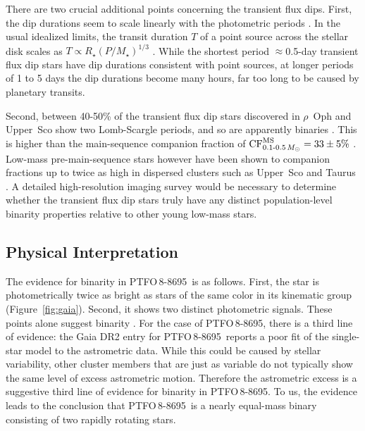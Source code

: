 \documentclass[12pt,twocolumn,tighten]{aastex62}
\newcommand{\ptfo}{PTFO$\,$8-8695}
\begin{document}
There are two crucial additional points concerning the transient flux
dips.  First, the dip durations seem to scale linearly with
the photometric periods \citep[][Figure~26]{stauffer_orbiting_2017}.  In the usual
idealized limits, the transit duration $T$ of a point source across
the stellar disk scales as $T \propto R_\star (P/M_\star)^{1/3}$
\citep{winn_exoplanet_2010}.  While the shortest period
$\approx$0.5-day transient flux dip stars have dip durations
consistent with point sources, at longer periods of 1 to 5 days the
dip durations become many hours, far too long to be caused by
planetary transits.

Second, between 40-50\% of the transient flux dip stars discovered in
$\rho$~Oph and Upper~Sco show two
Lomb-Scargle periods, and so are apparently binaries
\citep[][Table~1]{stauffer_orbiting_2017}.
This is higher than the main-sequence companion
fraction of ${\rm CF}_{0.1\text{-}0.5\,M_\odot}^{\rm MS} = 33 \pm 5\%$
\citep{henry_solar_2006,duchene_stellar_2013}.
Low-mass pre-main-sequence stars however have been shown to 
companion fractions up to twice as high in dispersed clusters such as
Upper~Sco and Taurus \citep{kraus_mapping_2008,kraus_mapping_2011}.
A detailed high-resolution imaging survey would be necessary to determine
whether the transient flux dip stars truly have any distinct
population-level binarity properties relative to other young low-mass
stars.


\subsection{Physical Interpretation}
\label{subsec:physical}

The evidence for binarity in \ptfo\ is as follows.  First, the star is
photometrically twice as bright as stars of the same color in its
kinematic group (Figure~\ref{fig:gaia}).  Second, it shows two distinct
photometric signals.  These points alone suggest binarity
\citep{stauffer_rotevol_2018}.  For the case of \ptfo, there is a
third line of evidence: the Gaia DR2 entry for \ptfo\ reports a poor
fit of the single-star model to the astrometric data.  While this could be caused
by stellar variability, other cluster members
that are just as variable do not typically show the same level of
excess astrometric motion.
Therefore the astrometric excess is a suggestive third line
of evidence for binarity in \ptfo. To us, the evidence leads to
the conclusion that \ptfo\ is a nearly equal-mass binary consisting
of two rapidly rotating stars.
\end{document}
